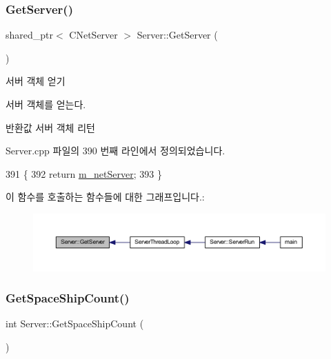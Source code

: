 \subsubsection{\texorpdfstring{Get\+Server()}{GetServer()}}
{\footnotesize\ttfamily shared\+\_\+ptr$<$ C\+Net\+Server $>$ Server\+::\+Get\+Server (\begin{DoxyParamCaption}{ }\end{DoxyParamCaption})}



서버 객체 얻기 

서버 객체를 얻는다.

\begin{DoxyReturn}{반환값}
서버 객체 리턴 
\end{DoxyReturn}


Server.\+cpp 파일의 390 번째 라인에서 정의되었습니다.


\begin{DoxyCode}
391 \{
392     \textcolor{keywordflow}{return} \hyperlink{class_server_acc5f0ab874532daace973f25df16888e}{m\_netServer};
393 \}
\end{DoxyCode}
이 함수를 호출하는 함수들에 대한 그래프입니다.\+:\nopagebreak
\begin{figure}[H]
\begin{center}
\leavevmode
\includegraphics[width=350pt]{class_server_a044bc662d96361b3bda25230533ec63b_icgraph}
\end{center}
\end{figure}
\mbox{\label{class_server_a43c5961b9519b2358127956c817a2120}} 
\subsubsection{\texorpdfstring{Get\+Space\+Ship\+Count()}{GetSpaceShipCount()}}
{\footnotesize\ttfamily int Server\+::\+Get\+Space\+Ship\+Count (\begin{DoxyParamCaption}{ }\end{DoxyParamCaption})\hspace{0.3cm}{\ttfamily [inline]}}



